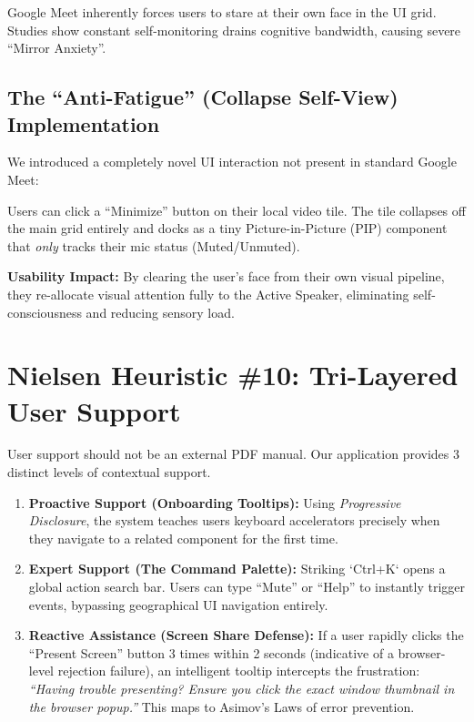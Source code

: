 \documentclass[12pt,a4paper]{article}
\begin{document}
Google Meet inherently forces users to stare at their own face in the UI grid. Studies show constant self-monitoring drains cognitive bandwidth, causing severe ``Mirror Anxiety''.

\subsection{The ``Anti-Fatigue'' (Collapse Self-View) Implementation}
We introduced a completely novel UI interaction not present in standard Google Meet:
\begin{tcolorbox}[colback=solutiongreen!10,colframe=solutiongreen,title=HCI Benefit: Cognitive Defense]
Users can click a ``Minimize'' button on their local video tile. The tile collapses off the main grid entirely and docks as a tiny Picture-in-Picture (PIP) component that \textit{only} tracks their mic status (Muted/Unmuted).
\end{tcolorbox}
\textbf{Usability Impact:} By clearing the user's face from their own visual pipeline, they re-allocate visual attention fully to the Active Speaker, eliminating self-consciousness and reducing sensory load.

\newpage

\section{Nielsen Heuristic \#10: Tri-Layered User Support}

User support should not be an external PDF manual. Our application provides 3 distinct levels of contextual support.

\begin{enumerate}
    \item \textbf{Proactive Support (Onboarding Tooltips):} Using \textit{Progressive Disclosure}, the system teaches users keyboard accelerators precisely when they navigate to a related component for the first time.
    \item \textbf{Expert Support (The Command Palette):} Striking `Ctrl+K` opens a global action search bar. Users can type ``Mute'' or ``Help'' to instantly trigger events, bypassing geographical UI navigation entirely.
    \item \textbf{Reactive Assistance (Screen Share Defense):} If a user rapidly clicks the ``Present Screen'' button 3 times within 2 seconds (indicative of a browser-level rejection failure), an intelligent tooltip intercepts the frustration: \textit{``Having trouble presenting? Ensure you click the exact window thumbnail in the browser popup.''} This maps to Asimov's Laws of error prevention.
\end{enumerate}
\end{document}
